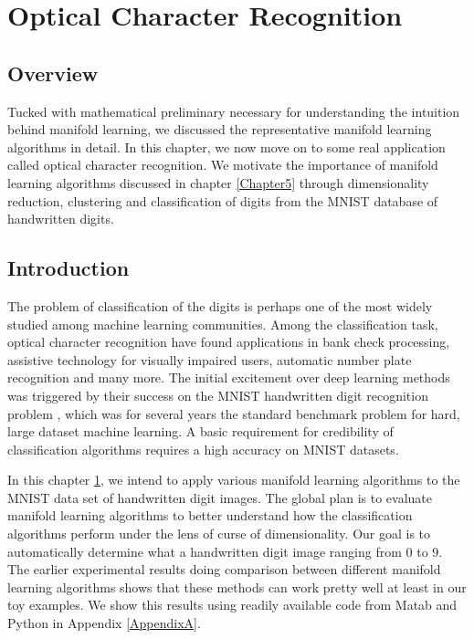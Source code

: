 \chapter{Optical Character Recognition} %

\label{Chapter4} %


\section*{Overview}
Tucked with mathematical preliminary necessary for understanding the intuition behind manifold learning, we discussed the representative manifold learning algorithms in detail. In this chapter, we now move on to some real application called optical character recognition. We motivate the importance of manifold learning algorithms discussed in chapter \ref{Chapter5} through  dimensionality reduction, clustering and classification of digits from the MNIST database of handwritten digits. %

\section{Introduction}
\label{C4:Intro}

The problem of classification of the digits is perhaps one of the most widely studied among machine learning communities. Among the classification task, optical character recognition have found applications in bank check processing, assistive technology for visually impaired users, automatic number plate recognition and many more. The initial excitement over deep learning methods was triggered by their success on the MNIST handwritten digit recognition problem \citep{LeCun1998}, which was for several years the standard benchmark problem for hard, large dataset machine learning. A basic requirement for credibility of classification algorithms  requires a high accuracy on MNIST datasets.

In this chapter \ref{Chapter4}, we intend to apply various manifold learning algorithms to the MNIST data set of handwritten digit images. The global plan is to evaluate manifold learning algorithms to better understand how the classification algorithms perform under the lens of curse of dimensionality. Our goal is to automatically determine what a handwritten digit image ranging from 0 to 9. The earlier experimental results doing comparison between different manifold learning algorithms shows that these methods can work pretty well at least in our toy examples. We show this results using readily available code from Matab and Python in Appendix \ref{AppendixA}.

